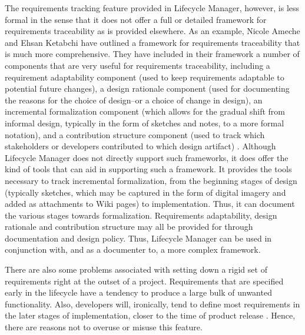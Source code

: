 \documentclass[letterpaper,10pt]{article}
\begin{document}
            The requirements tracking feature provided in Lifecycle Manager, 
            however, is less formal in the sense that it does not offer a 
            full or detailed framework for requirements traceability as is 
            provided elsewhere.  As an example, Nicole Ameche and Ehsan 
            Ketabchi have outlined a framework for requirements traceability 
            that is much more comprehensive.  They have included in their 
            framework a number of components that are very useful for 
            requirements traceability, including a requirement adaptability 
            component (used to keep requirements adaptable to potential 
            future changes), a design rationale component (used for 
            documenting the reasons for the choice of design--or a choice of 
            change in design), an incremental formalization component (which 
            allows for the gradual shift from informal design, typically in 
            the form of sketches and notes, to a more formal notation), and 
            a contribution structure component (used to track which 
            stakeholders or developers contributed to which design artifact) 
            \cite{ameche_ketabchi}.  Although Lifecycle Manager does not 
            directly support such frameworks, it does offer the kind of 
            tools that can aid in supporting such a framework.  It provides 
            the tools necessary to track incremental formalization, from the 
            beginning stages of design (typically sketches, which may be 
            captured in the form of digital imagery and added as attachments 
            to Wiki pages) to implementation.  Thus, it can document the 
            various stages towards formalization.  Requirements 
            adaptability, design rationale and contribution structure may 
            all be provided for through documentation and design policy.  
            Thus, Lifecycle Manager can be used in conjunction with, and as 
            a documenter to, a more complex framework.

            There are also some problems associated with setting down a 
            rigid set of requirements right at the outset of a project.  
            Requirements that are specified early in the lifecycle have a 
            tendency to produce a large bulk of unwanted functionality.  
            Also, developers will, ironically, tend to define most 
            requirements in the later stages of implementation, closer to 
            the time of product release \cite{ameche_ketabchi}.  Hence, 
            there are reasons not to overuse or misuse this feature.
\end{document}
